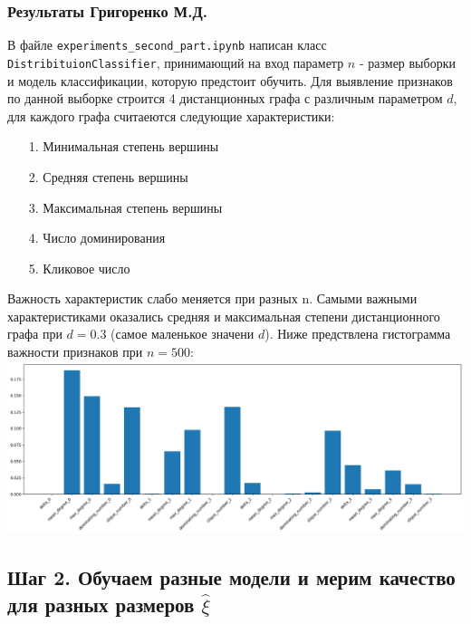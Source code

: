 \documentclass[a4paper,12pt]{article}
\begin{document}
\subsubsection*{Результаты Григоренко М.Д.}
В файле \texttt{experiments\_second\_part.ipynb} написан класс \texttt{DistribituionClassifier}, принимающий на вход параметр $n$ - размер выборки и модель классификации, которую предстоит обучить. Для выявление признаков по данной выборке строится 4 дистанционных графа с различным параметром $d$, для каждого графа считаеются следующие характеристики:
\begin{itemize}
    \item[1.] Минимальная степень вершины
    \item[2.] Средняя степень вершины
    \item[3.] Максимальная степень вершины
    \item[4.] Число доминирования
    \item[5.] Кликовое число
\end{itemize}
Важность характеристик слабо меняется при разных n. Самыми важными характеристиками оказались средняя и максимальная степени дистанционного графа при $d = 0.3$ (самое маленькое значени $d$). Ниже предствлена гистограмма важности признаков при $n = 500$: \newline
\includegraphics[width=\textwidth]{images/importances_barplot.png}


\subsection{Шаг 2. Обучаем разные модели и мерим качество для разных размеров $\hat{\xi}$}
\end{document}

